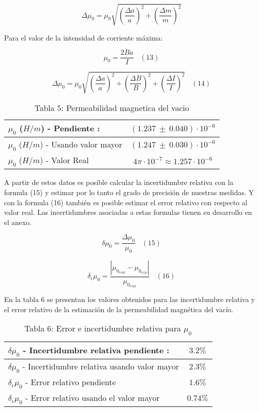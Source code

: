 \documentclass[article, 11pt]{report}
\begin{document}
$$ \Delta \mu_0 = \mu_0 \sqrt{(\dfrac{\Delta a}{a})^2 + (\dfrac{\Delta m}{m})^2} $$

Para el valor de la intensidad de corriente máxima:

$$ \mu_0 = \dfrac{2Ba}{I} ~~~~ (13)$$


$$ \Delta \mu_0 = \mu_0 \sqrt{(\dfrac{\Delta a}{a})^2   +  (\dfrac{\Delta B}{B})^2 + (\dfrac{\Delta I}{I})^2 } ~~~~ (14)$$


\vspace{0.25}
\begin{table}[H]
	\begin{center}
		\begin{tabular}{ |m{7.5cm}  |   c  | }
			\hline
			$\mu_0$ ($H/m$) - Pendiente :  &   $ (1.237 ~\pm~ 0.040)\cdot 10^{-6}$ \\ \hline
			$\mu_0$ ($H/m$) -  Usando valor mayor	 &  $ (1.247 ~\pm~ 0.030)\cdot 10^{-6} $ \\  \hline
			$\mu_0$ ($H/m$) -  Valor Real	 &  $ 4\pi \cdot 10^{-7} \approx 1.257 \cdot10^{-6} $ \\  \hline
		\end{tabular}
		\label{Tab:1}
		\caption*{Tabla 5: Permeabilidad magnetica del vacio}
	\end{center}
\end{table}





A partir de estos datos es posible calcular la incertidumbre relativa con la formula (15) y estimar por lo tanto el grado de precisión de nuestras medidas. Y con la formula (16) también es posible estimar el error relativo con respecto al valor real. Las incertidumbres asociadas a estas formulas tienen su desarrollo en el anexo.

$$ \delta \mu_0 = \dfrac{\Delta \mu_0}{\mu_0} ~~~~ (15)$$

$$ \delta_\epsilon \mu_0 = \dfrac{|\mu_0_{real} - \mu_0_{exp}|}{\mu_0_{real}} ~~~~ (16)$$


En la tabla 6 se presentan los valores obtenidos para las incertidumbre relativa y el error relativo de la estimación de la permeabilidad magnética del vacío.



\begin{table}[H]
	\begin{center}
		\begin{tabular}{ |m{9.5cm}  |   c  | }
			\hline
			$\delta \mu_0$ - Incertidumbre relativa pendiente :  &   $ 3.2 \% $ \\ \hline
			$\delta \mu_0$ -  Incertidumbre relativa usando valor mayor	 &  $ 2.3 \% $ \\  \hline
			$\delta_\epsilon \mu_0$  - Error relativo pendiente 	 &  $ 1.6 \%  $ \\  \hline
			$\delta_\epsilon \mu_0$ -  Error relativo usando el valor mayor	 &  $ 0.74 \%  $ \\  \hline
		\end{tabular}
		\label{Tab:1}
		\caption*{Tabla 6: Error e incertidumbre relativa para $\mu_0$ }
		\end{center}
	\end{table}
\end{document}
